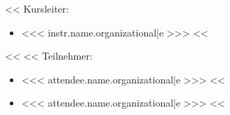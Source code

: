                 \begin{minipage}[t]{0.5\textwidth}
                    <<%
                        Kursleiter:
                        \begin{itemize}
                            <<%
                                \item <<< instr.name.organizational|e >>>
                            <<%
                        \end{itemize}
                    <<%
                    <<%
                    Teilnehmer:
                    \begin{itemize}
                        <<%
                            \item <<< attendee.name.organizational|e >>>
                        <<%
                    \end{itemize}
                \end{minipage}%
                \begin{minipage}[t]{0.5\textwidth}
                    \begin{itemize}
                        <<%
                            \item <<< attendee.name.organizational|e >>>
                        <<%
                    \end{itemize}
                \end{minipage}

